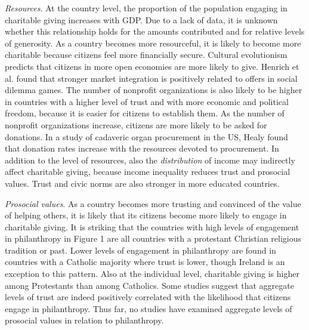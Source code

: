 \documentclass[twocolumn, serif, rga, numeric]{jote-article}
\begin{document}
\emph{Resources}. At the country level, the proportion of the population engaging in charitable giving increases with GDP.\cite{CAF2010, Bekkers2016a} Due to a lack of data, it is unknown whether this relationship holds for the amounts contributed and for relative levels of generosity.
As a country becomes more resourceful, it is likely to become more charitable because citizens feel more financially secure. Cultural evolutionism predicts that citizens in more open economies are more likely to give. Henrich et al. found that stronger market integration is positively related to offers in social dilemma games.\cite{Henrich2005} The number of nonprofit organizations is also likely to be higher in countries with a higher level of trust and with more economic and political freedom, because it is easier for citizens to establish them. As the number of nonprofit organizations increase, citizens are more likely to be asked for donations. In a study of cadaveric organ procurement in the US, Healy found that donation rates increase with the resources devoted to procurement.\cite{Healy2004} In addition to the level of resources, also the \emph{distribution} of income may indirectly affect charitable giving, because income inequality reduces trust\cite{Uslaner2010} and prosocial values.\cite{Paskov2012} Trust and civic norms are also stronger in more educated countries.\cite{Campbell2006}

\emph{Prosocial values}. As a country becomes more trusting and convinced of the value of helping others, it is likely that its citizens become more likely to engage in charitable giving. It is striking that the countries with high levels of engagement in philanthropy in Figure 1 are all countries with a protestant Christian religious tradition or past. Lower levels of engagement in philanthropy are found in countries with a Catholic majority where trust is lower, though Ireland is an exception to this pattern. Also at the individual level, charitable giving is higher among Protestants than among Catholics.\cite{Bekkers2011b} Some studies suggest that aggregate levels of trust are indeed positively correlated with the likelihood that citizens engage in philanthropy.\cite{Glanville, Evers2011} Thus far, no studies have examined aggregate levels of prosocial values in relation to philanthropy.
\end{document}
